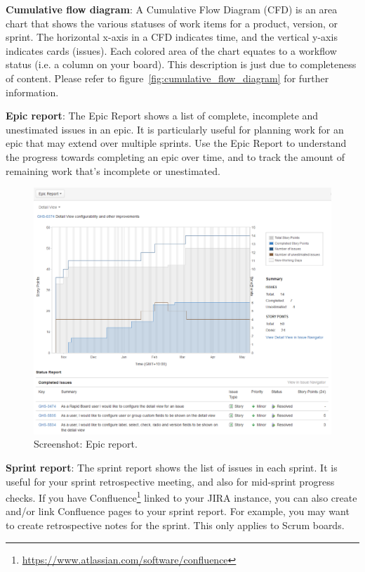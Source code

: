 \textbf{Cumulative flow diagram}: A Cumulative Flow Diagram (CFD) is an area chart that shows the various statuses of work items for a product, version, or sprint. The horizontal x-axis in a CFD indicates time, and the vertical y-axis indicates cards (issues). Each colored area of the chart equates to a workflow status (i.e. a column on your board). This description is just due to completeness of content. Please refer to figure~\ref{fig:cumulative_flow_diagram} for further information.

\textbf{Epic report}: The Epic Report shows a list of complete, incomplete and unestimated issues in an epic. It is particularly useful for planning work for an epic that may extend over multiple sprints.
Use the Epic Report to understand the progress towards completing an epic over time, and to track the amount of remaining work that's incomplete or unestimated.

\begin{figure}[h]
	\centering
	\includegraphics[scale=0.4]{img/epic-report.png}
	\caption{Screenshot: Epic report.} 
	\label{fig:epic-report}
\end{figure}

\textbf{Sprint report}: The sprint report shows the list of issues in each sprint. It is useful for your sprint retrospective meeting, and also for mid-sprint progress checks. If you have Confluence\footnote{\url{https://www.atlassian.com/software/confluence}} linked to your JIRA instance, you can also create and/or link Confluence pages to your sprint report. For example, you may want to create retrospective notes for the sprint. This only applies to Scrum boards.

